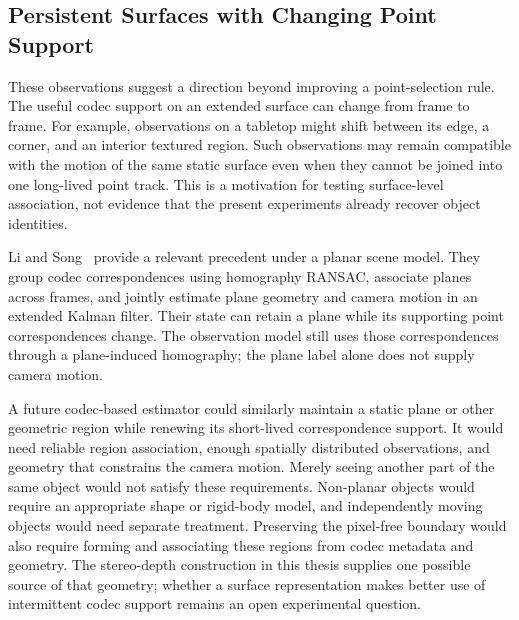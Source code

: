 \subsection{Persistent Surfaces with Changing Point Support}

These observations suggest a direction beyond improving a point-selection
rule. The useful codec support on an extended surface can change from frame
to frame. For example, observations on a tabletop might shift between its
edge, a corner, and an interior textured region. Such observations may remain
compatible with the motion of the same static surface even when they cannot
be joined into one long-lived point track. This is a motivation for testing
surface-level association, not evidence that the present experiments already
recover object identities.

Li and Song~\cite{li2014toward} provide a relevant precedent under a planar
scene model. They group codec correspondences using homography RANSAC,
associate planes across frames, and jointly estimate plane geometry and
camera motion in an extended Kalman filter. Their state can retain a plane
while its supporting point correspondences change. The observation model
still uses those correspondences through a plane-induced homography; the
plane label alone does not supply camera motion.

A future codec-based estimator could similarly maintain a static plane or
other geometric region while renewing its short-lived correspondence support.
It would need reliable region association, enough spatially distributed
observations, and geometry that constrains the camera motion. Merely seeing
another part of the same object would not satisfy these requirements.
Non-planar objects would require an appropriate shape or rigid-body model,
and independently moving objects would need separate treatment. Preserving
the pixel-free boundary would also require forming and associating these
regions from codec metadata and geometry. The stereo-depth construction in
this thesis supplies one possible source of that geometry; whether a surface
representation makes better use of intermittent codec support remains an
open experimental question.
